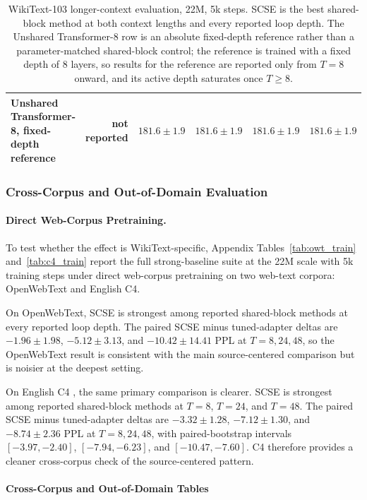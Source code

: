\documentclass[letterpaper]{article} %
\newcommand{\SCSE}{\textsc{SCSE}}
\theoremstyle{remark}
\begin{document}
\begin{table}[t!]
\begin{tabular}{lrrrrr}
		\addlinespace[2pt]
		Unshared Transformer-8, fixed-depth reference & not reported                 & $181.6\pm1.9$          & $181.6\pm1.9$          & $181.6\pm1.9$          & $181.6\pm1.9$          \\
		\bottomrule
	\end{tabular}
	\caption{WikiText-103 longer-context evaluation, 22M, 5k steps.  \SCSE{} is the best shared-block method at both context lengths and every reported loop depth.  The Unshared Transformer-8 row is an absolute fixed-depth reference rather than a parameter-matched shared-block control; the reference is trained with a fixed depth of 8 layers, so results for the reference are reported only from $T=8$ onward, and its active depth saturates once $T\ge 8$.}
	\label{tab:contexts}
\end{table}

\subsubsection{Cross-Corpus and Out-of-Domain Evaluation}
\label{app:cross-corpus-ood-evaluation}
\paragraph{Direct Web-Corpus Pretraining.} To test whether the effect is WikiText-specific, Appendix Tables~\ref{tab:owt_train} and~\ref{tab:c4_train} report the full strong-baseline suite at the 22M scale with 5k training steps under direct web-corpus pretraining on two web-text corpora: OpenWebText and English C4.

On OpenWebText, \SCSE{} is strongest among reported shared-block methods at every reported loop depth.  The paired \SCSE{} minus tuned-adapter deltas are $-1.96\pm1.98$, $-5.12\pm3.13$, and $-10.42\pm14.41$ PPL at $T=8,24,48$, so the OpenWebText result is consistent with the main source-centered comparison but is noisier at the deepest setting.

On English C4 \citep{raffel2020t5}, the same primary comparison is clearer.  \SCSE{} is strongest among reported shared-block methods at $T=8$, $T=24$, and $T=48$.  The paired \SCSE{} minus tuned-adapter deltas are $-3.32\pm1.28$, $-7.12\pm1.30$, and $-8.74\pm2.36$ PPL at $T=8,24,48$, with paired-bootstrap intervals $[-3.97,-2.40]$, $[-7.94,-6.23]$, and $[-10.47,-7.60]$.  C4 therefore provides a cleaner cross-corpus check of the source-centered pattern.

\paragraph{Cross-Corpus and Out-of-Domain Tables}
\label{app:cross-corpus-ood}
\end{document}
